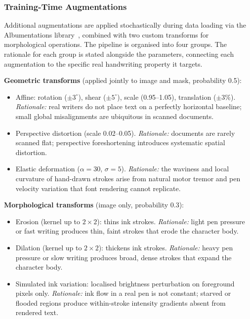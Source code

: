 \documentclass[a4paper,11pt]{article}
\begin{document}
\subsubsection{Training-Time Augmentations}

Additional augmentations are applied stochastically during data loading via the
Albumentations library~\cite{albumentations2020}, combined with two custom transforms
for morphological operations. The pipeline is organised into four groups. The rationale
for each group is stated alongside the parameters, connecting each augmentation to the
specific real handwriting property it targets.

\medskip
\noindent\textbf{Geometric transforms} (applied jointly to image and mask, probability
0.5):
\begin{itemize}[noitemsep]
    \item Affine: rotation ($\pm 3^{\circ}$), shear ($\pm 5^{\circ}$), scale (0.95--1.05), translation
          ($\pm 3\%$). \emph{Rationale:} real writers do not place text on a perfectly
          horizontal baseline; small global misalignments are ubiquitous in scanned
          documents.
    \item Perspective distortion (scale 0.02--0.05). \emph{Rationale:} documents are
          rarely scanned flat; perspective foreshortening introduces systematic spatial
          distortion.
    \item Elastic deformation ($\alpha = 30$, $\sigma = 5$). \emph{Rationale:} the
          waviness and local curvature of hand-drawn strokes arise from natural motor
          tremor and pen velocity variation that font rendering cannot replicate.
\end{itemize}

\medskip
\noindent\textbf{Morphological transforms} (image only, probability 0.3):
\begin{itemize}[noitemsep]
    \item Erosion (kernel up to $2 \times 2$): thins ink strokes. \emph{Rationale:} light
          pen pressure or fast writing produces thin, faint strokes that erode the
          character body.
    \item Dilation (kernel up to $2 \times 2$): thickens ink strokes. \emph{Rationale:}
          heavy pen pressure or slow writing produces broad, dense strokes that expand the
          character body.
    \item Simulated ink variation: localised brightness perturbation on foreground pixels
          only. \emph{Rationale:} ink flow in a real pen is not constant; starved or
          flooded regions produce within-stroke intensity gradients absent from rendered
          text.
\end{itemize}
\end{document}
